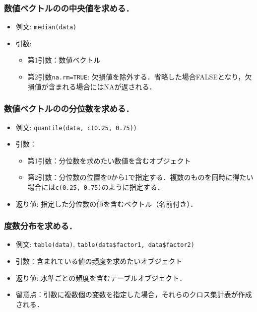 \documentclass[
  xelatex, ja=standard]{bxjsarticle}
\providecommand{\tightlist}{%
  \setlength{\itemsep}{0pt}\setlength{\parskip}{0pt}}
\begin{document}
\subsubsection{数値ベクトルのの中央値を求める．}\label{ux6570ux5024ux30d9ux30afux30c8ux30ebux306eux306eux4e2dux592eux5024ux3092ux6c42ux3081ux308b}

\begin{itemize}
\tightlist
\item
  例文: \texttt{median(data)}
\item
  引数:

  \begin{itemize}
  \tightlist
  \item
    第1引数：数値ベクトル
  \item
    第2引数\texttt{na.rm=TRUE}:
    欠損値を除外する．省略した場合FALSEとなり，欠損値が含まれる場合にはNAが返される．
  \end{itemize}
\end{itemize}

\subsubsection{数値ベクトルのの分位数を求める．}\label{ux6570ux5024ux30d9ux30afux30c8ux30ebux306eux306eux5206ux4f4dux6570ux3092ux6c42ux3081ux308b}

\begin{itemize}
\tightlist
\item
  例文: \texttt{quantile(data,\ c(0.25,\ 0.75))}
\item
  引数：

  \begin{itemize}
  \tightlist
  \item
    第1引数：分位数を求めたい数値を含むオブジェクト
  \item
    第2引数：分位数の位置を0から1で指定する．複数のものを同時に得たい場合には\texttt{c(0.25,\ 0.75)}のように指定する．
  \end{itemize}
\item
  返り値: 指定した分位数の値を含むベクトル（名前付き）．
\end{itemize}

\subsubsection{度数分布を求める．}\label{ux5ea6ux6570ux5206ux5e03ux3092ux6c42ux3081ux308b}

\begin{itemize}
\tightlist
\item
  例文: \texttt{table(data)},
  \texttt{table(data\$factor1,\ data\$factor2)}
\item
  引数：含まれている値の頻度を求めたいオブジェクト
\item
  返り値: 水準ごとの頻度を含むテーブルオブジェクト．
\item
  留意点：引数に複数個の変数を指定した場合，それらのクロス集計表が作成される．
\end{itemize}
\end{document}
